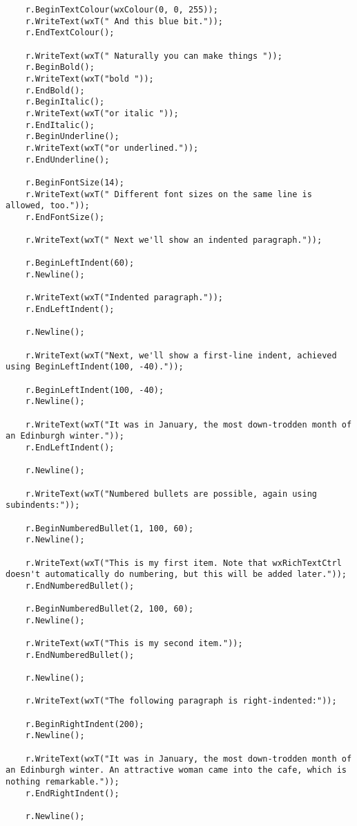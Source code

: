 {\begin{verbatim}
    r.BeginTextColour(wxColour(0, 0, 255));
    r.WriteText(wxT(" And this blue bit."));
    r.EndTextColour();

    r.WriteText(wxT(" Naturally you can make things "));
    r.BeginBold();
    r.WriteText(wxT("bold "));
    r.EndBold();
    r.BeginItalic();
    r.WriteText(wxT("or italic "));
    r.EndItalic();
    r.BeginUnderline();
    r.WriteText(wxT("or underlined."));
    r.EndUnderline();

    r.BeginFontSize(14);
    r.WriteText(wxT(" Different font sizes on the same line is allowed, too."));
    r.EndFontSize();

    r.WriteText(wxT(" Next we'll show an indented paragraph."));

    r.BeginLeftIndent(60);
    r.Newline();

    r.WriteText(wxT("Indented paragraph."));
    r.EndLeftIndent();

    r.Newline();

    r.WriteText(wxT("Next, we'll show a first-line indent, achieved using BeginLeftIndent(100, -40)."));

    r.BeginLeftIndent(100, -40);
    r.Newline();

    r.WriteText(wxT("It was in January, the most down-trodden month of an Edinburgh winter."));
    r.EndLeftIndent();

    r.Newline();

    r.WriteText(wxT("Numbered bullets are possible, again using subindents:"));

    r.BeginNumberedBullet(1, 100, 60);
    r.Newline();

    r.WriteText(wxT("This is my first item. Note that wxRichTextCtrl doesn't automatically do numbering, but this will be added later."));
    r.EndNumberedBullet();

    r.BeginNumberedBullet(2, 100, 60);
    r.Newline();

    r.WriteText(wxT("This is my second item."));
    r.EndNumberedBullet();

    r.Newline();

    r.WriteText(wxT("The following paragraph is right-indented:"));

    r.BeginRightIndent(200);
    r.Newline();

    r.WriteText(wxT("It was in January, the most down-trodden month of an Edinburgh winter. An attractive woman came into the cafe, which is nothing remarkable."));
    r.EndRightIndent();

    r.Newline();


\end{verbatim}}
